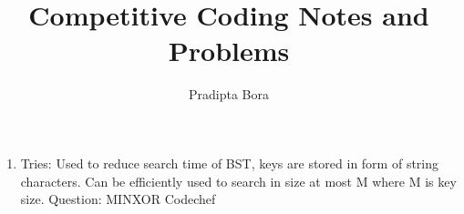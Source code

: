 \documentclass{article}
\title{Competitive Coding Notes and Problems }
\author{Pradipta Bora}
\begin{document}
  \maketitle
  \begin{enumerate}
  	\item Tries: Used to reduce search time of BST, keys are stored in form of string characters. Can be efficiently used to search in size at most M where M is key size. Question: MINXOR Codechef
  \end{enumerate}
\end{document}
